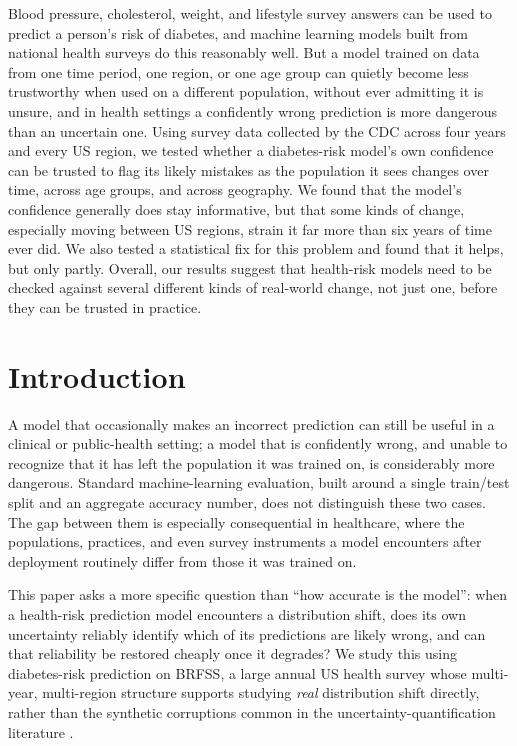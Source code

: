 \documentclass[12pt]{article}
\begin{document}
Blood pressure, cholesterol, weight, and lifestyle survey answers can be used to predict a person's risk of diabetes, and machine learning models built from national health surveys do this reasonably well. But a model trained on data from one time period, one region, or one age group can quietly become less trustworthy when used on a different population, without ever admitting it is unsure, and in health settings a confidently wrong prediction is more dangerous than an uncertain one. Using survey data collected by the CDC across four years and every US region, we tested whether a diabetes-risk model's own confidence can be trusted to flag its likely mistakes as the population it sees changes over time, across age groups, and across geography. We found that the model's confidence generally does stay informative, but that some kinds of change, especially moving between US regions, strain it far more than six years of time ever did. We also tested a statistical fix for this problem and found that it helps, but only partly. Overall, our results suggest that health-risk models need to be checked against several different kinds of real-world change, not just one, before they can be trusted in practice.

\section{Introduction}

A model that occasionally makes an incorrect prediction can still be useful in a clinical or public-health setting; a model that is confidently wrong, and unable to recognize that it has left the population it was trained on, is considerably more dangerous. Standard machine-learning evaluation, built around a single train/test split and an aggregate accuracy number, does not distinguish these two cases. The gap between them is especially consequential in healthcare, where the populations, practices, and even survey instruments a model encounters after deployment routinely differ from those it was trained on.

This paper asks a more specific question than ``how accurate is the model'': when a health-risk prediction model encounters a distribution shift, does its own uncertainty reliably identify which of its predictions are likely wrong, and can that reliability be restored cheaply once it degrades? We study this using diabetes-risk prediction on BRFSS, a large annual US health survey whose multi-year, multi-region structure supports studying \emph{real} distribution shift directly, rather than the synthetic corruptions common in the uncertainty-quantification literature \citep{ovadia2019trust,koh2021wilds}.
\end{document}
